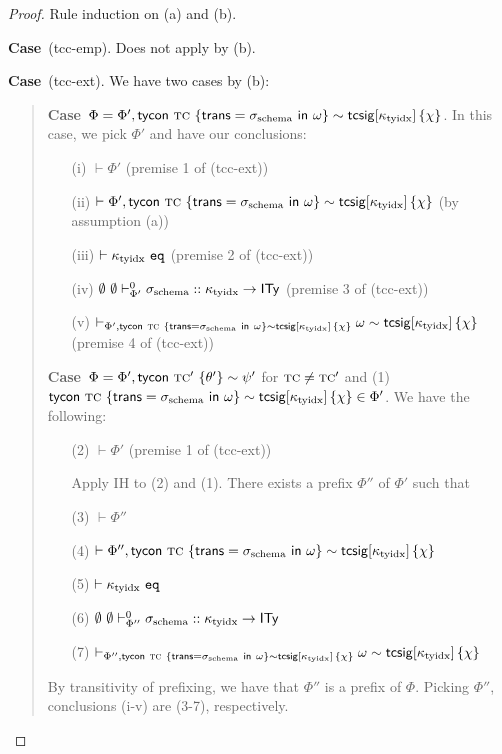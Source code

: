 \documentclass[12pt]{article}
\newcommand{\pfcase}[1]{\textbf{Case}~#1. }
\begin{document}
\begin{proof} Rule induction on (a) and (b).

\pfcase{(tcc-emp)} Does not apply by (b).

\pfcase{(tcc-ext)} We have two cases by (b):\begin{quote}
\pfcase{$\Phi=\Phi', {\sf tycon}~\textsc{tc} ~\{{\sf trans}=\sigma_\text{schema}~{\sf in}~\omega\} \sim {\sf tcsig}[\kappa_\text{tyidx}]\,\{\chi\}$} In this case, we pick $\Phi'$ and have our conclusions:
\begin{enumerate}
\item[(i)] $\vdash \Phi'$ (premise 1 of (tcc-ext))
\item[(ii)] $\vdash \Phi', {\sf tycon}~\textsc{tc} ~\{{\sf trans}=\sigma_\text{schema}~{\sf in}~\omega\} \sim {\sf tcsig}[\kappa_\text{tyidx}]\,\{\chi\}$ (by assumption (a))
\item[(iii)] $\vdash \kappa_\text{tyidx}~\mathtt{eq}$ (premise 2 of (tcc-ext))
\item[(iv)] $\emptyset~\emptyset \vdash_{\Phi'}^{0} \sigma_\text{schema} :: \kappa_\text{tyidx} \rightarrow {\sf ITy}$ (premise 3 of (tcc-ext))
\item[(v)] $\vdash_{\Phi', {\sf tycon}~\textsc{tc} ~\{{\sf trans}=\sigma_\text{schema}~{\sf in}~\omega\} \sim {\sf tcsig}[\kappa_\text{tyidx}]\,\{\chi\}} \omega \sim {\sf tcsig}[\kappa_\text{tyidx}]\,\{\chi\}$ (premise 4 of (tcc-ext))
\end{enumerate}

\pfcase{$\Phi=\Phi', {\sf tycon}~\textsc{tc}' ~\{\theta'\} \sim \psi'$ for $\textsc{tc}\neq\textsc{tc}'$ and (1) ${\sf tycon}~\textsc{tc} ~\{{\sf trans}=\sigma_\text{schema}~{\sf in}~\omega\} \sim {\sf tcsig}[\kappa_\text{tyidx}]\,\{\chi\} \in \Phi'$} We have the following:

\begin{enumerate}
\item[(2)] $\vdash \Phi'$ (premise 1 of (tcc-ext))
\item[] Apply IH to (2) and (1). There exists a prefix $\Phi''$ of $\Phi'$ such that 
\item[(3)] $\vdash \Phi''$
\item[(4)] $\vdash \Phi'', {\sf tycon}~\textsc{tc} ~\{{\sf trans}=\sigma_\text{schema}~{\sf in}~\omega\} \sim {\sf tcsig}[\kappa_\text{tyidx}]\,\{\chi\}$
\item[(5)] $\vdash \kappa_\text{tyidx}~\mathtt{eq}$ 
\item[(6)] $\emptyset~\emptyset \vdash_{\Phi''}^{0} \sigma_\text{schema} :: \kappa_\text{tyidx} \rightarrow {\sf ITy}$
\item[(7)] $\vdash_{\Phi'',  {\sf tycon}~\textsc{tc} ~\{{\sf trans}=\sigma_\text{schema}~{\sf in}~\omega\} \sim {\sf tcsig}[\kappa_\text{tyidx}]\,\{\chi\}} \omega \sim {\sf tcsig}[\kappa_\text{tyidx}]\,\{\chi\}$
\end{enumerate}

By transitivity of prefixing, we have that $\Phi''$ is a prefix of $\Phi$. Picking $\Phi''$, conclusions (i-v) are (3-7), respectively.
\end{quote}
\end{proof}
\end{document}
